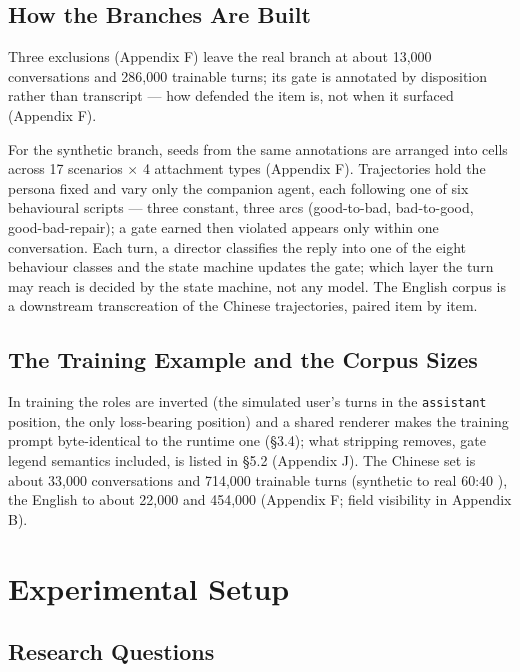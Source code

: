 \documentclass[letterpaper]{article}
\begin{document}
\subsection{How the Branches Are Built}

Three exclusions (Appendix F) leave the real branch at about 13,000 conversations and 286,000 trainable turns; its gate is annotated by disposition rather than transcript --- how defended the item is, not when it surfaced (Appendix F).

For the synthetic branch, seeds from the same annotations are arranged into cells across 17 scenarios $\times$ 4 attachment types \citep{companionbench} (Appendix F). Trajectories hold the persona fixed and vary only the companion agent, each following one of six behavioural scripts --- three constant, three arcs (good-to-bad, bad-to-good, good-bad-repair); a gate earned then violated appears only within one conversation. Each turn, a director classifies the reply into one of the eight behaviour classes and the state machine updates the gate; which layer the turn may reach is decided by the state machine, not any model. The English corpus is a downstream transcreation of the Chinese trajectories, paired item by item.


\subsection{The Training Example and the Corpus Sizes}

In training the roles are inverted (the simulated user's turns in the \texttt{assistant} position, the only loss-bearing position) and a shared renderer makes the training prompt byte-identical to the runtime one (\S{}3.4); what stripping removes, gate legend semantics included, is listed in \S{}5.2 (Appendix J). The Chinese set is about 33,000 conversations and 714,000 trainable turns (synthetic to real 60:40 \citep{companionbench}), the English to about 22,000 and 454,000 (Appendix F; field visibility in Appendix B).


\section{Experimental Setup}



\subsection{Research Questions}
\end{document}
